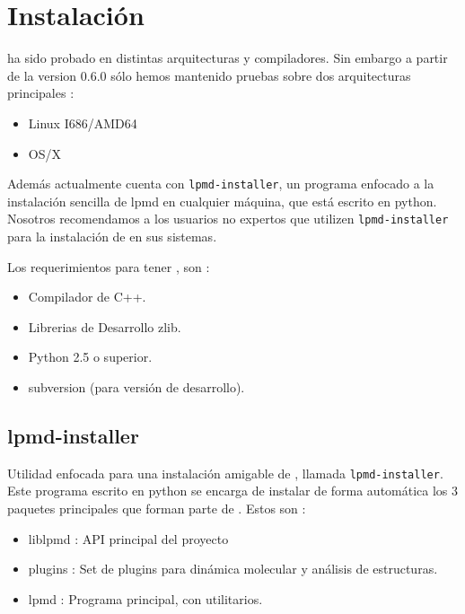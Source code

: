 \chapter{Instalaci\'on}
\label{chap:inst}

{\lpmd} ha sido probado en distintas arquitecturas y compiladores. Sin embargo a partir de la version 0.6.0 s\'olo hemos mantenido pruebas sobre dos arquitecturas principales :

\begin{itemize}
 \item Linux I686/AMD64
 \item OS/X
\end{itemize}

Adem\'as actualmente {\lpmd} cuenta con \verb|lpmd-installer|, un programa enfocado a la instalaci\'on sencilla de lpmd en cualquier m\'aquina, que est\'a escrito en python. Nosotros recomendamos a los usuarios no expertos que utilizen \verb|lpmd-installer| para la instalaci\'on de {\lpmd} en sus sistemas.

Los requerimientos para tener {\lpmd}, son :

\begin{itemize}
 \item Compilador de C++.
 \item Librerias de Desarrollo zlib.
 \item Python 2.5 o superior.
 \item subversion (para versi\'on de desarrollo).
\end{itemize} 

\section{lpmd-installer}

Utilidad enfocada para una instalaci\'on amigable de {\lpmd}, llamada \verb|lpmd-installer|. Este programa escrito en python se encarga de instalar de forma autom\'atica los 3 paquetes principales que forman parte de {\lpmd}. Estos son :

\begin{itemize}
 \item liblpmd : API principal del proyecto
 \item plugins : Set de plugins para din\'amica molecular y an\'alisis de estructuras.
 \item lpmd : Programa principal, con utilitarios.
\end{itemize}



